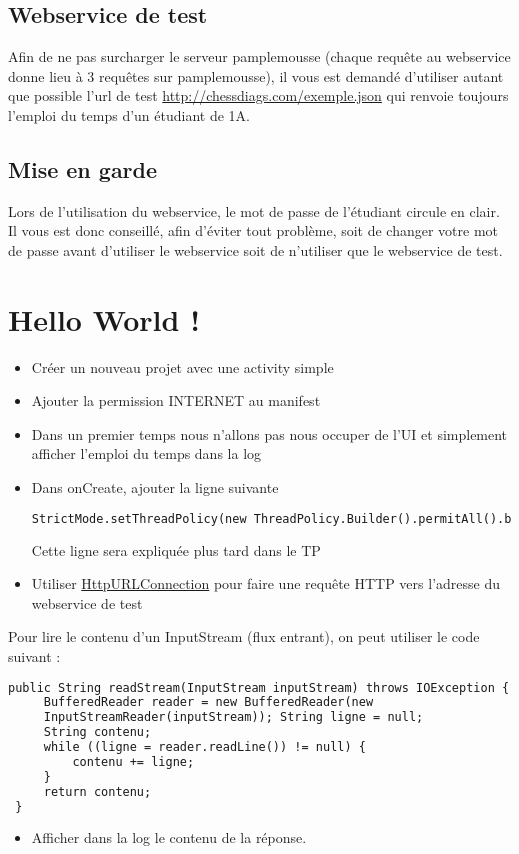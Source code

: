 \documentclass{article}
\begin{document}
\subsection{Webservice de test}
Afin de ne pas surcharger le serveur pamplemousse (chaque requête au webservice
donne lieu à 3 requêtes sur pamplemousse), il vous est demandé d'utiliser
autant que possible l'url de test
\href{http://chessdiags.com/exemple.json}{http://chessdiags.com/exemple.json}
qui renvoie toujours l'emploi du temps d'un étudiant de 1A.
\subsection{Mise en garde}
Lors de l'utilisation du webservice, le mot de passe de l'étudiant
circule en clair. Il vous est donc conseillé, afin d'éviter tout problème, soit
de changer votre mot de passe avant d'utiliser le webservice soit de n'utiliser
que le webservice de test.
\section{Hello World !}
\begin{itemize} 
  \item Créer un nouveau projet avec une activity simple
  \item Ajouter la permission INTERNET au manifest
  \item Dans un premier temps nous n'allons pas nous occuper de l'UI et
  simplement afficher l'emploi du temps dans la log
  \item Dans onCreate, ajouter la ligne suivante 
\begin{lstlisting}[language=XML]
StrictMode.setThreadPolicy(new ThreadPolicy.Builder().permitAll().build());
\end{lstlisting}
Cette ligne sera expliquée plus tard dans le TP
  \item Utiliser
  \href{http://developer.android.com/reference/java/net/HttpURLConnection.html}{HttpURLConnection}
  pour faire une requête HTTP vers l'adresse du webservice de test
\end{itemize}
Pour lire le contenu d'un InputStream (flux entrant), on peut utiliser le code
suivant :
 \begin{lstlisting}[language=XML]
 public String readStream(InputStream inputStream) throws IOException {
     BufferedReader reader = new BufferedReader(new
     InputStreamReader(inputStream)); String ligne = null;
     String contenu;
     while ((ligne = reader.readLine()) != null) {
         contenu += ligne;
     }
     return contenu;
 }
\end{lstlisting}
\begin{itemize} 
  \item Afficher dans la log le contenu de la réponse.
\end{itemize}
\end{document}
